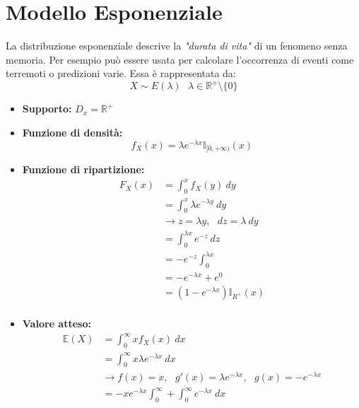 \documentclass[11pt]{report}
\begin{document}
\section{Modello Esponenziale}
La distribuzione esponenziale descrive la \textit{"durata di vita"} di un fenomeno senza memoria. Per esempio può essere usata per calcolare l'occorrenza di eventi come terremoti o predizioni varie. Essa è rappresentata da:
\begin{equation}
    X \sim E(\lambda)\ \ \ \lambda\in\mathbb{R}^+\setminus\{0\}
\end{equation}
\begin{itemize}
	\item \textbf{Supporto:} $D_x=\mathbb{R}^+$
    \item \textbf{Funzione di densità:}
    \begin{equation}
        f_X(x) = \lambda e^{-\lambda x} \mathbb{I}_{[0,+\infty)}(x)
    \end{equation}
    \item \textbf{Funzione di ripartizione:}
    \begin{equation}
    	\begin{split}
   			F_X(x) & = \int_0^x f_X(y)\ dy\\
            & = \int_0^x \lambda e^{-\lambda y}\ dy\\
            & \rightarrow z = \lambda y,\ \ \ dz = \lambda\ dy\\
            & = \int_0^{\lambda x} e^{-z}\ dz\\
            & = - e^{-z} \int_0^{\lambda x}\\
            & = - e^{-\lambda x} + e^0\\
            & = \left( 1 - e^{-\lambda x} \right) \mathbb{I}_{R^+}(x)\\
		\end{split}
    \end{equation}
    \item \textbf{Valore atteso:}
    \begin{equation}
    	\begin{split}
   			\mathbb{E}(X) & = \int_0^\infty x f_X(x)\ dx\\
            & = \int_0^\infty x \lambda e^{-\lambda x}\ dx\\
            & \rightarrow f(x)=x,\ \ \ g'(x)=\lambda e^{-\lambda x},\ \ \ g(x)=-e^{-\lambda x}\\
            & = -xe^{-\lambda x} \int_0^\infty + \int_0^\infty e^{-\lambda x}\ dx\\

\end{split}
\end{equation}
\end{itemize}
\end{document}
